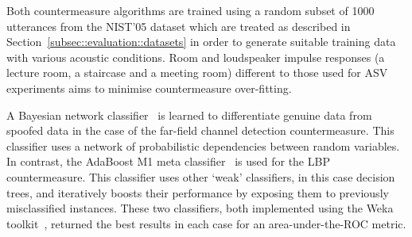 Both countermeasure algorithms are trained using a random subset of 1000 utterances from the NIST'05 dataset which are treated as described in Section~\ref{subsec::evaluation::datasets} in order to generate suitable training data with various acoustic conditions. 
Room and loudspeaker impulse responses (a lecture room, a staircase and a meeting room) different to those used for ASV experiments aims to minimise countermeasure over-fitting.

A Bayesian network classifier~\cite{Pearl1988} is learned to differentiate genuine data from spoofed data in the case of the far-field channel detection countermeasure.  This classifier uses a network of probabilistic dependencies between random variables.  In contrast, the AdaBoost M1 meta classifier~\cite{Freund1999} is used for the LBP countermeasure.  This classifier  uses other `weak' classifiers, in this case decision trees, and iteratively boosts their performance by exposing them to previously misclassified instances.  These two classifiers, both implemented using the Weka toolkit~\cite{Weka}, returned the best results in each case for an area-under-the-ROC metric. %


